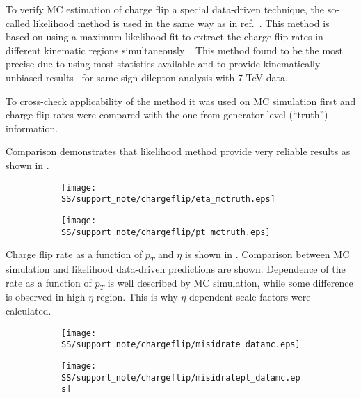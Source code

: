 To verify MC estimation of charge flip a special data-driven technique, the so-called likelihood method is used in the same way as in ref.~\cite{same_sign_paper_7tev}.
This method is based on using a maximum likelihood fit to extract the charge flip rates in different kinematic regions simultaneously~\cite{cf_top_paper}.
This method found to be the most precise due to using most statistics available and to provide kinematically unbiased results~\cite{anthony_thesis} 
for same-sign dilepton analysis with 7 TeV data.

To cross-check applicability of the method it was used on 
MC simulation first and charge flip rates were compared with the one from generator level (``truth'') information. 

Comparison demonstrates that likelihood method provide very reliable results as shown in
.

\begin{figure}
\begin{subfigure}{.5\textwidth}
  \centering
  \texttt{[image: SS/support\_note/chargeflip/eta\_mctruth.eps]}
\end{subfigure}%
\begin{subfigure}{.5\textwidth}
  \centering
  \texttt{[image: SS/support\_note/chargeflip/pt\_mctruth.eps]}
\end{subfigure}
\caption{\toDo}
\label{fig:likelihood_cross_check}
\end{figure}

Charge flip rate as a function of $p_T$ and $\eta$ is shown in .
Comparison between MC simulation and likelihood data-driven predictions are shown. 
Dependence of the rate as a function of $p_T$ is well described by MC simulation, while some difference is observed
in high-$\eta$ region. This is why $\eta$ dependent scale factors were calculated.

\begin{figure}
\begin{subfigure}{.5\textwidth}
  \centering
  \texttt{[image: SS/support\_note/chargeflip/misidrate\_datamc.eps]}
\end{subfigure}%
\begin{subfigure}{.5\textwidth}
  \centering
  \texttt{[image: SS/support\_note/chargeflip/misidratept\_datamc.eps]}
\end{subfigure}
\caption{\toDo}
\label{fig:charge_flip_data_vs_mc}
\end{figure}

